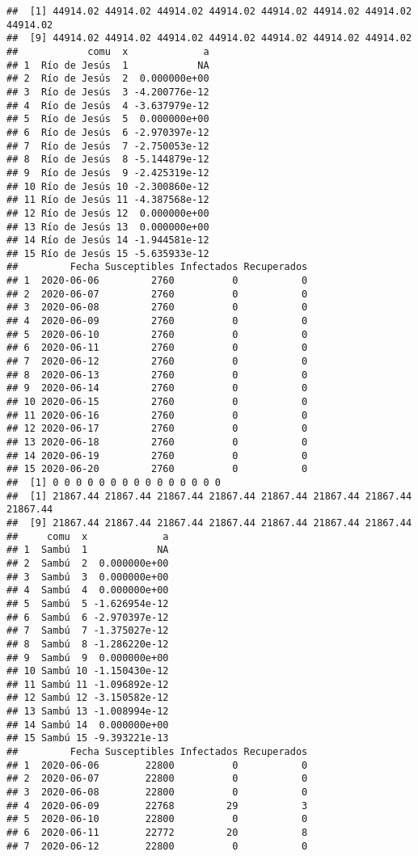 \documentclass[
]{article}
\begin{document}
\begin{verbatim}
##  [1] 44914.02 44914.02 44914.02 44914.02 44914.02 44914.02 44914.02 44914.02
##  [9] 44914.02 44914.02 44914.02 44914.02 44914.02 44914.02 44914.02
##            comu  x             a
## 1  Río de Jesús  1            NA
## 2  Río de Jesús  2  0.000000e+00
## 3  Río de Jesús  3 -4.200776e-12
## 4  Río de Jesús  4 -3.637979e-12
## 5  Río de Jesús  5  0.000000e+00
## 6  Río de Jesús  6 -2.970397e-12
## 7  Río de Jesús  7 -2.750053e-12
## 8  Río de Jesús  8 -5.144879e-12
## 9  Río de Jesús  9 -2.425319e-12
## 10 Río de Jesús 10 -2.300860e-12
## 11 Río de Jesús 11 -4.387568e-12
## 12 Río de Jesús 12  0.000000e+00
## 13 Río de Jesús 13  0.000000e+00
## 14 Río de Jesús 14 -1.944581e-12
## 15 Río de Jesús 15 -5.635933e-12
##         Fecha Susceptibles Infectados Recuperados
## 1  2020-06-06         2760          0           0
## 2  2020-06-07         2760          0           0
## 3  2020-06-08         2760          0           0
## 4  2020-06-09         2760          0           0
## 5  2020-06-10         2760          0           0
## 6  2020-06-11         2760          0           0
## 7  2020-06-12         2760          0           0
## 8  2020-06-13         2760          0           0
## 9  2020-06-14         2760          0           0
## 10 2020-06-15         2760          0           0
## 11 2020-06-16         2760          0           0
## 12 2020-06-17         2760          0           0
## 13 2020-06-18         2760          0           0
## 14 2020-06-19         2760          0           0
## 15 2020-06-20         2760          0           0
##  [1] 0 0 0 0 0 0 0 0 0 0 0 0 0 0 0
##  [1] 21867.44 21867.44 21867.44 21867.44 21867.44 21867.44 21867.44 21867.44
##  [9] 21867.44 21867.44 21867.44 21867.44 21867.44 21867.44 21867.44
##     comu  x             a
## 1  Sambú  1            NA
## 2  Sambú  2  0.000000e+00
## 3  Sambú  3  0.000000e+00
## 4  Sambú  4  0.000000e+00
## 5  Sambú  5 -1.626954e-12
## 6  Sambú  6 -2.970397e-12
## 7  Sambú  7 -1.375027e-12
## 8  Sambú  8 -1.286220e-12
## 9  Sambú  9  0.000000e+00
## 10 Sambú 10 -1.150430e-12
## 11 Sambú 11 -1.096892e-12
## 12 Sambú 12 -3.150582e-12
## 13 Sambú 13 -1.008994e-12
## 14 Sambú 14  0.000000e+00
## 15 Sambú 15 -9.393221e-13
##         Fecha Susceptibles Infectados Recuperados
## 1  2020-06-06        22800          0           0
## 2  2020-06-07        22800          0           0
## 3  2020-06-08        22800          0           0
## 4  2020-06-09        22768         29           3
## 5  2020-06-10        22800          0           0
## 6  2020-06-11        22772         20           8
## 7  2020-06-12        22800          0           0

\end{verbatim}
\end{document}
